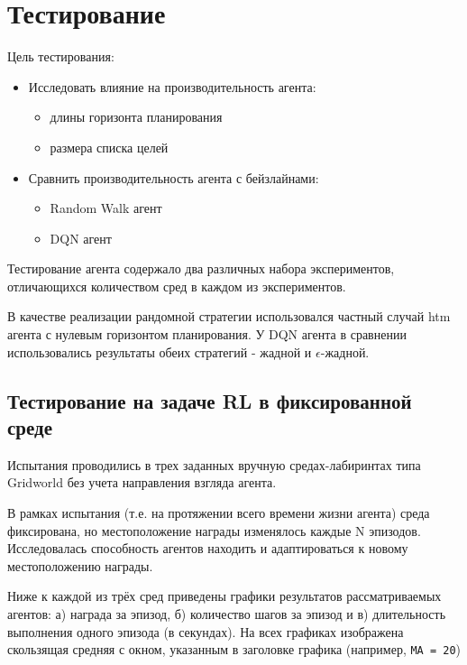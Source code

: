 \documentclass[a4paper]{article}
\begin{document}
\section{Тестирование}

Цель тестирования:

\begin{itemize}
    \item Исследовать влияние на производительность агента:
    \begin{itemize}
        \item длины горизонта планирования
        \item размера списка целей
    \end{itemize}
    
    \item Сравнить производительность агента с бейзлайнами:
    \begin{itemize}
        \item Random Walk агент
        \item DQN агент
    \end{itemize}
\end{itemize}

Тестирование агента содержало два различных набора экспериментов, отличающихся количеством сред в каждом из экспериментов.

В качестве реализации рандомной стратегии использовался частный случай htm агента с нулевым горизонтом планирования. У DQN агента в сравнении использовались результаты обеих стратегий - жадной и $\epsilon$-жадной.


\subsection{Тестирование на задаче RL в фиксированной среде}

Испытания проводились в трех заданных вручную средах-лабиринтах типа Gridworld без учета направления взгляда агента.

В рамках испытания (т.е. на протяжении всего времени жизни агента) среда фиксирована, но местоположение награды изменялось каждые N эпизодов. Исследовалась способность агентов находить и адаптироваться к новому местоположению награды.

Ниже к каждой из трёх сред приведены графики результатов рассматриваемых агентов: а) награда за эпизод, б) количество шагов за эпизод и в) длительность выполнения одного эпизода (в секундах). На всех графиках изображена скользящая средняя с окном, указанным в заголовке графика (например, \verb|MA = 20|)
\end{document}
